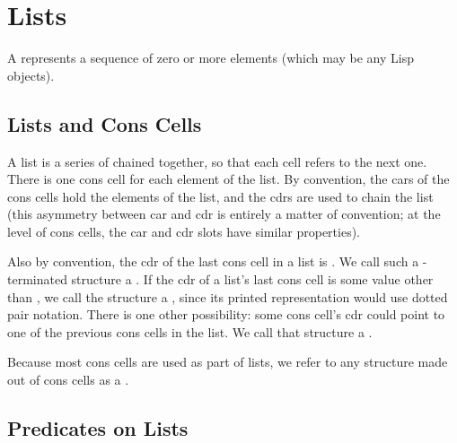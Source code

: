 
\chapter{Lists}
\label{cha:lists}

A  represents a sequence of zero or more elements (which may be any Lisp objects).


\section{Lists and Cons Cells}
\label{sec:lists-cons-cells}

A list is a series of  chained together, so that each cell refers to the next one.
There is one cons cell for each element of the list.
By convention, the cars of the cons cells hold the elements of the list, and the cdrs are used to chain the list (this asymmetry between car and cdr is entirely a matter of convention; at the level of cons cells, the car and cdr slots have similar properties).

Also by convention, the cdr of the last cons cell in a list is .
We call such a -terminated structure a .
If the cdr of a list’s last cons cell is some value other than , we call the structure a , since its printed representation would use dotted pair notation.
There is one other possibility: some cons cell’s cdr could point to one of the previous cons cells in the list. We call that structure a .

Because most cons cells are used as part of lists, we refer to any structure made out of cons cells as a .




\section{Predicates on Lists}
\label{sec:predicates-lists}

